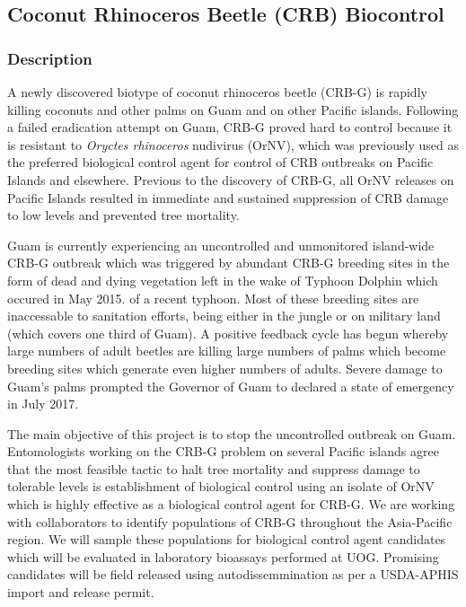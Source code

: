 \subsection{Coconut Rhinoceros Beetle (CRB) Biocontrol}\label{sec:coconut-rhinoceros-beetle-(crb)-biocontrol}
\begin{refsection}
	
\subsubsection{Description}

A newly discovered biotype of coconut rhinoceros beetle (CRB-G) is
rapidly killing coconuts and other palms on Guam and on other Pacific
islands. Following a failed eradication attempt on Guam, CRB-G proved
hard to control because it is resistant to \emph{Oryctes rhinoceros}
nudivirus (OrNV), which was previously used as the preferred biological
control agent for control of CRB outbreaks on Pacific Islands and
elsewhere. Previous to the discovery of CRB-G, all OrNV releases on
Pacific Islands resulted in immediate and sustained suppression of
CRB damage to low levels and prevented tree mortality.

Guam is currently experiencing an uncontrolled and unmonitored island-wide
CRB-G outbreak which was triggered by abundant CRB-G breeding sites
in the form of dead and dying vegetation left in the wake of Typhoon
Dolphin which occured in May 2015. of a recent typhoon. Most of these
breeding sites are inaccessable to sanitation efforts, being either
in the jungle or on military land (which covers one third of Guam).
A positive feedback cycle has begun whereby large numbers of adult
beetles are killing large numbers of palms which become breeding sites
which generate even higher numbers of adults. Severe damage to Guam\textquoteright s
palms prompted the Governor of Guam to declared a state of emergency
in July 2017.

The main objective of this project is to stop the uncontrolled outbreak
on Guam. Entomologists working on the CRB-G problem on several Pacific
islands agree that the most feasible tactic to halt tree mortality
and suppress damage to tolerable levels is establishment of biological
control using an isolate of OrNV which is highly effective as a biological
control agent for CRB-G. We are working with collaborators to identify
populations of CRB-G throughout the Asia-Pacific region. We will sample
these populations for biological control agent candidates which will
be evaluated in laboratory bioassays performed at UOG. Promising candidates
will be field released using autodissemmination as per a USDA-APHIS
import and release permit.


\end{refsection}

